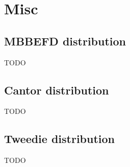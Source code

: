 \chapter{Misc}
\section{MBBEFD distribution}
TODO
\section{Cantor distribution}
TODO
\section{Tweedie distribution}
TODO